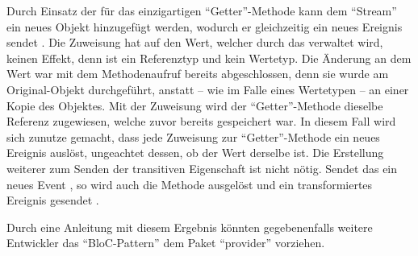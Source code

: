 Durch Einsatz der für das  einzigartigen \enquote{Getter}-Methode  kann dem \enquote{Stream} ein neues Objekt hinzugefügt werden,
wodurch er gleichzeitig ein neues Ereignis sendet .
Die Zuweisung hat auf den Wert, welcher durch das  verwaltet wird, keinen Effekt, denn  ist ein Referenztyp und kein Wertetyp.
Die Änderung an dem Wert war mit dem Methodenaufruf  bereits abgeschlossen,
denn sie wurde am Original-Objekt durchgeführt, anstatt -- wie im Falle eines Wertetypen -- an einer Kopie des Objektes.
Mit der Zuweisung  wird der \enquote{Getter}-Methode dieselbe Referenz zugewiesen,
welche zuvor bereits gespeichert war.
In diesem Fall wird sich zunutze gemacht, dass jede Zuweisung zur \enquote{Getter}-Methode  ein neues Ereignis auslöst,
ungeachtet dessen, ob der Wert derselbe ist.
Die Erstellung weiterer  zum Senden der transitiven Eigenschaft  ist nicht nötig.
Sendet das   ein neues Event ,
so wird auch die Methode  ausgelöst und ein transformiertes Ereignis gesendet .

Durch eine Anleitung mit diesem Ergebnis könnten gegebenenfalls weitere Entwickler das \enquote{BloC-Pattern} dem Paket \enquote{provider} vorziehen.


